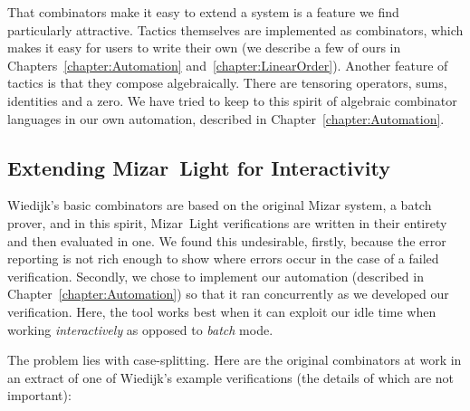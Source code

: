 That combinators make it easy to extend a system is a feature we find particularly attractive. Tactics themselves are implemented as combinators, which makes it easy for users to write their own (we describe a few of ours in Chapters~\ref{chapter:Automation} and~\ref{chapter:LinearOrder}). Another feature of tactics is that they compose algebraically. There are tensoring operators, sums, identities and a zero. We have tried to keep to this spirit of algebraic combinator languages in our own automation, described in Chapter~\ref{chapter:Automation}.

\subsection{Extending Mizar~Light for Interactivity}\label{sec:MizarLightExtend}
Wiedijk's basic combinators are based on the original Mizar system, a batch prover, and in this spirit, Mizar~Light verifications are written in their entirety and then evaluated in one. We found this undesirable, firstly, because the error reporting is not rich enough to show where errors occur in the case of a failed verification. Secondly, we chose to implement our automation (described in Chapter~\ref{chapter:Automation}) so that it ran concurrently as we developed our verification. Here, the tool works best when it can exploit our idle time when working \emph{interactively} as opposed to \emph{batch} mode.

The problem lies with case-splitting. Here are the original combinators at work in an extract of one of Wiedijk's example verifications (the details of which are not important):

\vspace{0.5cm}
\begin{minipage}{\linewidth}
  \footnotesize



  \code{\enspace [fix ["p1:Point"; "p2:Point"];}


  \code{\quad\enspace[[suppose "p1 = p2";}

  \code{\qquad\enspace qed from [0] by [LEMMA1]];}

  \code{\qquad [suppose "$\neg$(p1 = p2)";}

  \code{\qquad\enspace qed from [1]]]];}

\end{minipage}
\vspace{0.5cm}

